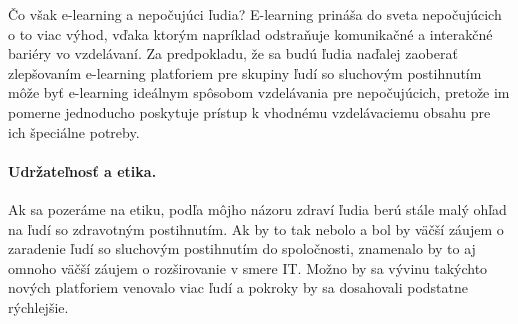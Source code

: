 \documentclass[10pt,oneside,slovak,a4paper]{article}
\begin{document}
Čo však e-learning a nepočujúci ľudia? E-learning prináša do sveta nepočujúcich o to viac výhod, vďaka ktorým napríklad odstraňuje komunikačné a interakčné bariéry vo vzdelávaní. Za predpokladu, že sa budú ľudia naďalej zaoberať zlepšovaním e-learning platforiem pre skupiny ľudí so sluchovým postihnutím môže byť e-learning ideálnym spôsobom vzdelávania pre nepočujúcich, pretože im pomerne jednoducho poskytuje prístup k vhodnému vzdelávaciemu obsahu pre ich špeciálne potreby.

\paragraph{Udržateľnosť a etika. }
Ak sa pozeráme na etiku, podľa môjho názoru zdraví ľudia berú stále malý ohľad na ľudí so zdravotným postihnutím. Ak by to tak nebolo a bol by väčší záujem o zaradenie ľudí so sluchovým postihnutím do spoločnosti, znamenalo by to aj omnoho väčší záujem o rozširovanie v smere IT. Možno by sa vývinu takýchto nových platforiem venovalo viac ľudí a pokroky by sa dosahovali podstatne rýchlejšie. 



\end{document}
